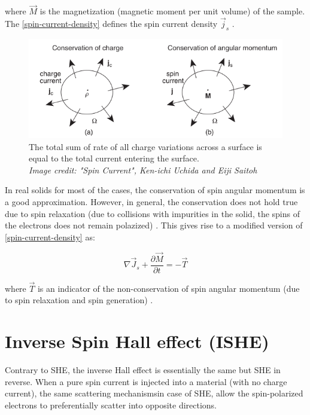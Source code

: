 where $ \vec{M} $ is the magnetization (magnetic moment per unit volume) of the sample. The \cref{spin-current-density} defines the spin current density $ \vec{j}_s $ \cite{Uchida_2016}.

\begin{figure}[h!]
    \includegraphics[width=\columnwidth]{spin-current.png}
    \caption{The total sum of rate of all charge variations across a surface is equal to the total current entering the surface.\\ \vspace{0.2cm} \textit{Image credit: "Spin Current", Ken-ichi Uchida and Eiji Saitoh}}
\end{figure}


In real solids for most of the cases, the conservation of spin angular momentum is a good approximation. However, in general, the conservation does not hold true due to spin relaxation (due to collisions with impurities in the solid, the spins of the electrons does not remain polazized) \cite{Uchida_2016}. This gives rise to a modified version of \cref{spin-current-density} as:

\begin{equation}
    \nabla \vec{J}_s + \frac{\partial \vec{M}}{\partial t} = -\vec{T}
\end{equation}

where $ \vec{T} $ is an indicator of the non-conservation of spin angular momentum (due to spin relaxation and spin generation) \cite{Uchida_2016}.

\section{Inverse Spin Hall effect (ISHE)}

Contrary to SHE, the inverse Hall effect is essentially the same but SHE in reverse. When a pure spin current is injected into a material (with no charge current), the same scattering mechanisms\footnotemark[\value{footnote}] in case of SHE, allow the spin-polarized electrons to preferentially scatter into opposite directions.

